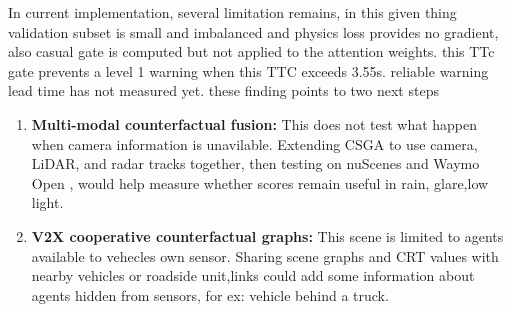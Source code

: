 \documentclass[preprint,12pt]{elsarticle}
\begin{document}
In current implementation, several limitation remains, in this given thing validation subset is small and imbalanced and physics loss provides no gradient, also casual gate is computed but not applied to the attention weights. this TTc gate prevents a level 1 warning when this TTC exceeds 3.55s. reliable warning lead time has not measured yet. these finding points to two next steps
\begin{enumerate}
    \item \textbf{Multi-modal counterfactual fusion:} This does not test what happen when camera information is unavilable. Extending CSGA to use camera, LiDAR, and radar tracks together, then testing on nuScenes \cite{caesar2020nuscenes} and Waymo Open \cite{sun2020waymo}, would help measure whether scores remain useful in rain, glare,low light.
    \item \textbf{V2X cooperative counterfactual graphs:} This scene is limited to agents available to vehecles own sensor. Sharing scene graphs and CRT values with nearby vehicles or roadside unit,links could add some information about agents hidden from sensors, for ex: vehicle behind a truck.
\end{enumerate}


\end{document}
